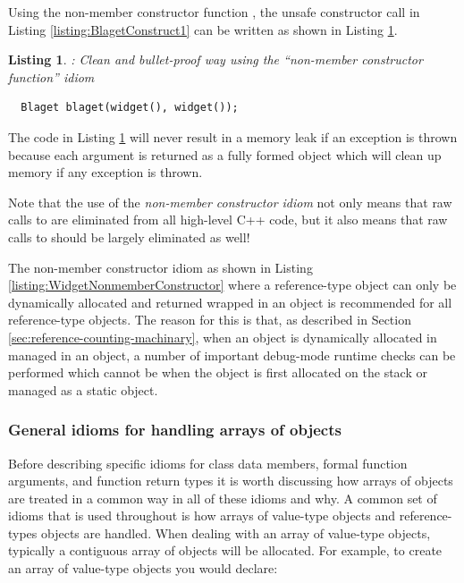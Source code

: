 \documentclass[pdf,ps2pdf,11pt]{SANDreport}
\newtheorem{listing}{Listing}
\begin{document}
Using the non-member constructor function {}, the
unsafe constructor call in Listing {}\ref{listing:BlagetConstruct1} can
be written as shown in Listing {}\ref{listing:BlagetConstruct3}.

\begin{listing}: Clean and bullet-proof way using the ``non-member
constructor function'' idiom \\
\label{listing:BlagetConstruct3}
{\small\begin{verbatim}
  Blaget blaget(widget(), widget());
\end{verbatim}}
\end{listing}

The code in Listing {}\ref{listing:BlagetConstruct3} will never result
in a memory leak if an exception is thrown because each argument is
returned as a fully formed {} object which will clean up
memory if any exception is thrown.

Note that the use of the {}\textit{non-member constructor idiom} not
only means that raw calls to {} are eliminated from all
high-level C++ code, but it also means that raw calls to
{} should be largely eliminated as well!

The non-member constructor idiom as shown in Listing
{}\ref{listing:WidgetNonmemberConstructor} where a reference-type
object can only be dynamically allocated and returned wrapped in an
{} object is recommended for all reference-type objects.
The reason for this is that, as described in Section
{}\ref{sec:reference-counting-machinary}, when an object is
dynamically allocated in managed in an {} object, a number
of important debug-mode runtime checks can be performed which cannot
be when the object is first allocated on the stack or managed as a
static object.


%
{}\subsubsection{General idioms for handling arrays of objects}
%

Before describing specific idioms for class data members, formal
function arguments, and function return types it is worth discussing
how arrays of objects are treated in a common way in all of these
idioms and why.  A common set of idioms that is used throughout is how
arrays of value-type objects and reference-types objects are handled.
When dealing with an array of value-type objects, typically a
contiguous array of objects will be allocated.  For example, to create
an array of value-type objects you would declare:
\end{document}

